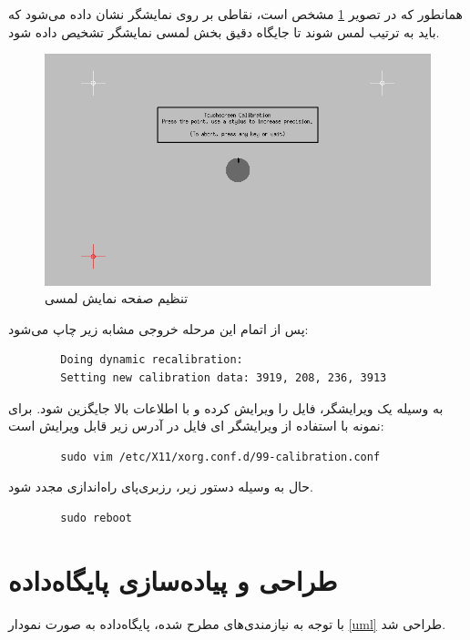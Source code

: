 همانطور که در تصویر \ref{calibrate} مشخص است، نقاطی بر روی نمایشگر نشان داده می‌شود که باید به ترتیب لمس شوند تا جایگاه دقیق بخش لمسی نمایشگر تشخیص داده شود.
\begin{figure}[t!]
    \centering
    \includegraphics[scale=0.5]{figures/calibrate.png}
    \caption{تنظیم صفحه نمایش لمسی }
    \label{calibrate}
\end{figure}

پس از اتمام این مرحله خروجی مشابه زیر چاپ می‌شود:
\begin{latin}
    \begin{lstlisting}
        Doing dynamic recalibration:
        Setting new calibration data: 3919, 208, 236, 3913
    \end{lstlisting}
\end{latin}

به وسیله یک ویرایشگر، فایل  را ویرایش کرده و با اطلاعات بالا جایگزین شود. برای نمونه با استفاده از ویرایشگر  ای فایل در آدرس زیر قابل ویرایش است:
\begin{latin}
    \begin{lstlisting}
        sudo vim /etc/X11/xorg.conf.d/99-calibration.conf
    \end{lstlisting}
\end{latin}

حال به وسیله دستور زیر، رزبری‌پای راه‌اندازی مجدد شود.
\begin{latin}
    \begin{lstlisting}
        sudo reboot
    \end{lstlisting}
\end{latin}


\section{طراحی و پیاده‌سازی پایگاه‌داده}
با توجه به نیازمندی‌های مطرح شده، پایگاه‌داده به صورت نمودار \ref{uml} طراحی شد.

